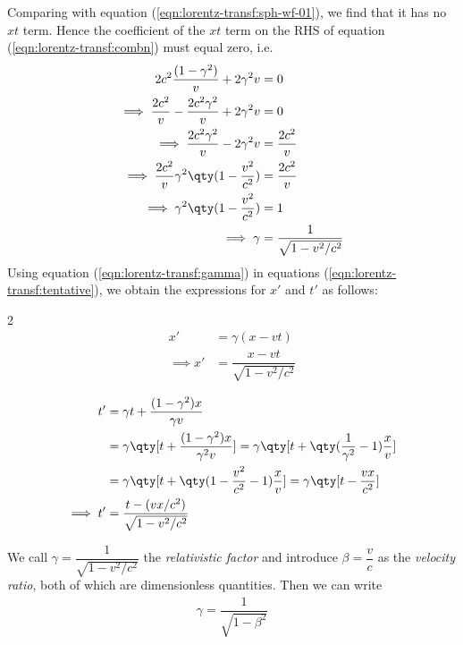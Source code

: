 	Comparing with equation (\ref{eqn:lorentz-transf:sph-wf-01}), we find that it has no $xt$ term. Hence the coefficient of the $xt$ term on the RHS of equation (\ref{eqn:lorentz-transf:combn}) must equal zero, i.e.
	\begin{align}
		2c^2\dfrac{(1-\gamma^2)}{v}+2\gamma^2v&=0 \nonumber\\
		\implies\dfrac{2c^2}{v}-\dfrac{2c^2\gamma^2}{v}+2\gamma^2v&=0 \nonumber\\
		\implies\dfrac{2c^2\gamma^2}{v}-2\gamma^2v&=\dfrac{2c^2}{v} \nonumber\\
		\implies\dfrac{2c^2}{v}\gamma^2\qty(1-\dfrac{v^2}{c^2})&=\dfrac{2c^2}{v} \nonumber\\
		\implies\gamma^2\qty(1-\dfrac{v^2}{c^2})&=1 \nonumber\\
		\implies\gamma&=\dfrac{1}{\sqrt{1-v^2/c^2}} \label{eqn:lorentz-transf:gamma}
	\end{align}
	Using equation (\ref{eqn:lorentz-transf:gamma}) in equations (\ref{eqn:lorentz-transf:tentative}), we obtain the expressions for $x'$ and $t'$ as follows:\vspace{-1.5em}
	\begin{multicols}{2}
		\begin{align*}
			x'&=\gamma(x-vt) \\
			\implies x'&=\dfrac{x-vt}{\sqrt{1-v^2/c^2}}
		\end{align*}		
		
		\begin{align*}
			t'&=\gamma t+\dfrac{(1-\gamma^2)x}{\gamma v} \\
				&=\gamma\qty[t+\dfrac{(1-\gamma^2)x}{\gamma^2v}]=\gamma\qty[t+\qty(\dfrac{1}{\gamma^2}-1)\dfrac{x}{v}] \\
				&=\gamma\qty[t+\qty(1-\dfrac{v^2}{c^2}-1)\dfrac{x}{v}]=\gamma\qty[t-\dfrac{vx}{c^2}] \\
			\implies t'&=\dfrac{t-(vx/c^2)}{\sqrt{1-v^2/c^2}}
		\end{align*}
		
	\end{multicols}
	
	We call $\gamma=\dfrac{1}{\sqrt{1-v^2/c^2}}$ the \emph{relativistic factor} and introduce $\beta=\dfrac{v}{c}$ as the \emph{velocity ratio}, both of which are dimensionless quantities. Then we can write
	\begin{align*}
		\gamma=\dfrac{1}{\sqrt{1-\beta^2}}
	\end{align*}
	
